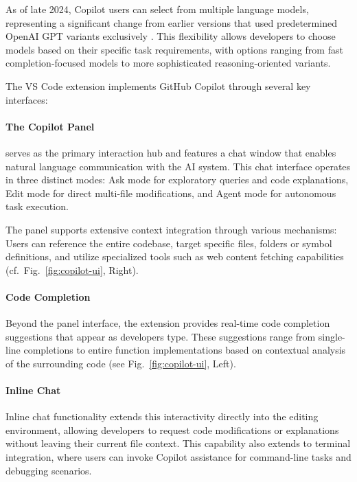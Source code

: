 As of late 2024, Copilot users can select from multiple language models, representing a significant change from earlier versions that used predetermined OpenAI GPT variants exclusively \cite{copilot-llm-select}. 
This flexibility allows developers to choose models based on their specific task requirements, with options ranging from fast completion-focused models to more sophisticated reasoning-oriented variants.

The VS Code extension implements GitHub Copilot through several key interfaces:

\vspace{-1\baselineskip}
\paragraph{The Copilot Panel} serves as the primary interaction hub and features a chat window that enables natural language communication with the AI system.
This chat interface operates in three distinct modes: Ask mode for exploratory queries and code explanations, Edit mode for direct multi-file modifications, and Agent mode for autonomous task execution.

The panel supports extensive context integration through various mechanisms: Users can reference the entire codebase, target specific files, folders or symbol definitions, and utilize specialized tools such as web content fetching capabilities (cf.\ Fig.\ \ref{fig:copilot-ui}, Right).

\vspace{-0.8\baselineskip}
\paragraph{Code Completion}
Beyond the panel interface, the extension provides real-time code completion suggestions that appear as developers type.
These suggestions range from single-line completions to entire function implementations based on contextual analysis of the surrounding code (see Fig.\ \ref{fig:copilot-ui}, Left).

\vspace{-0.8\baselineskip}
\paragraph{Inline Chat}
Inline chat functionality extends this interactivity directly into the editing environment, allowing developers to request code modifications or explanations without leaving their current file context.
This capability also extends to terminal integration, where users can invoke Copilot assistance for command-line tasks and debugging scenarios.

